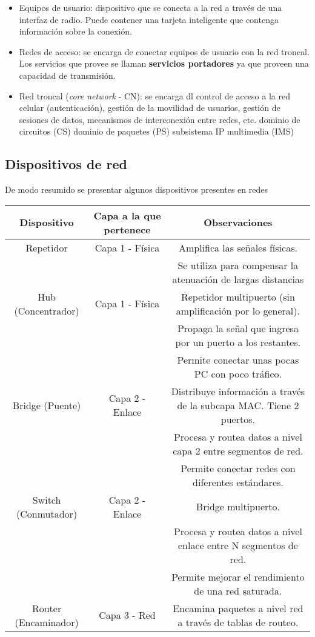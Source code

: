 \documentclass{book}
\begin{document}
	\begin{itemize}
		\item Equipos de usuario: dispositivo que se conecta a la red a través de una interfaz de radio. Puede contener una tarjeta inteligente que contenga información sobre la conexión.
		\item Redes de acceso: se encarga de conectar equipos de usuario con la red troncal. Los servicios que provee se llaman \textbf{servicios portadores} ya que proveen una capacidad de transmisión.
		\item Red troncal (\textit{core network} - CN): se encarga dl control de acceso a la red celular (autenticación), gestión de la movilidad de usuarios, gestión de sesiones de datos, mecanismos de interconexión entre redes, etc.
		\subitem* dominio de circuitos (CS)
		\subitem* dominio de paquetes (PS)
		\subitem* subsistema IP multimedia (IMS)
	\end{itemize}
	
	\subsection{Dispositivos de red}
	De modo resumido se presentar algunos dispositivos presentes en redes
	
	\begin{table}[H]
		\centering
		\begin{tabular}{|c|c|c|}
			\hline
			Dispositivo&Capa a la que pertenece&Observaciones\\
			\hline
			Repetidor&Capa 1 - Física&Amplifica las señales físicas.\\
			&&Se utiliza para compensar la atenuación de largas distancias\\
			\hline
			Hub (Concentrador)&Capa 1 - Física&Repetidor multipuerto (sin amplificación por lo general).\\
			&&Propaga la señal que ingresa por un puerto a los restantes.\\
			&&Permite conectar unas pocas PC con poco tráfico.\\
			\hline
			Bridge (Puente)&Capa 2 - Enlace&Distribuye información a través de la subcapa MAC. Tiene 2 puertos.\\
			&&Procesa y routea datos a nivel capa 2 entre segmentos de red.\\
			&&Permite conectar redes con diferentes estándares.\\
			\hline
			Switch (Conmutador)&Capa 2 - Enlace&Bridge multipuerto.\\
			&&Procesa y routea datos a nivel enlace entre N segmentos de red.\\
			&&Permite mejorar el rendimiento de una red saturada.\\
			\hline
			Router (Encaminador)&Capa 3 - Red&Encamina paquetes a nivel red a través de tablas de routeo.\\
			\hline
		\end{tabular}
	\end{table}
	
\end{document}
